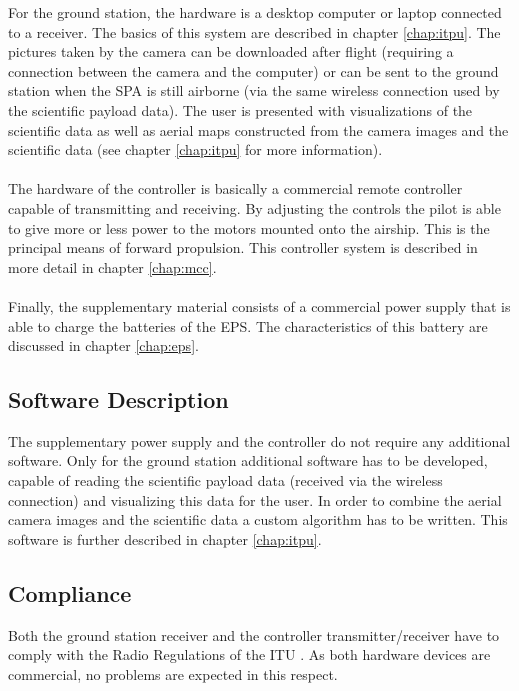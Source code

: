 For the ground station, the hardware is a desktop computer or laptop connected to a receiver. The basics of this system are described in chapter \ref{chap:itpu}. The pictures taken by the camera can be downloaded after flight (requiring a connection between the camera and the computer) or can be sent to the ground station when the \ac{SPA} is still airborne (via the same wireless connection used by the scientific payload data). The user is presented with visualizations of the scientific data as well as aerial maps constructed from the camera images and the scientific data (see chapter \ref{chap:itpu} for more information).
\\
\\
The hardware of the controller is basically a commercial remote controller capable of transmitting and receiving. By adjusting the controls the pilot is able to give more or less power to the motors mounted onto the airship. This is the principal means of forward propulsion. This controller system is described in more detail in chapter \ref{chap:mcc}.
\\
\\
Finally, the supplementary material consists of a commercial power supply that is able to charge the batteries of the \ac{EPS}. The characteristics of this battery are discussed in chapter \ref{chap:eps}.

\subsection{Software Description}

The supplementary power supply and the controller do not require any additional software. Only for the ground station additional software has to be developed, capable of reading the scientific payload data (received via the wireless connection) and visualizing this data for the user. In order to combine the aerial camera images and the scientific data a custom algorithm has to be written. This software is further described in chapter \ref{chap:itpu}.

\subsection{Compliance}

Both the ground station receiver and the controller transmitter/receiver have to comply with the Radio Regulations of the \ac{ITU} \cite{book:freqalloc}. As both hardware devices are commercial, no problems are expected in this respect.

